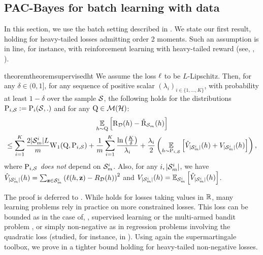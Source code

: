 \subsection{PAC-Bayes for batch learning with \iid data}
\label{sec:wasserstein-batch}

In this section, we use the batch setting described in .
We state our first result, holding for heavy-tailed losses admitting order 2 moments.
Such an assumption is in line, for instance, with reinforcement learning with heavy-tailed reward (see, \eg, \citealp{liu2011multi,lu2019optimal,zhuang2021regret}).

\begin{restatable}{theorem}{theoremsupervisedht}\label{theorem:supervised-ht}
We assume the loss $\loss$ to be $L$-Lipschitz.
Then, for any $\delta\in(0,1]$, for any sequence of positive scalar $(\lambda_i)_{i\in \{1,\dots,K\}}$, with probability at least $1-\delta$ over the sample $\S$, the following holds for the distributions $\P_{i,\S}\defeq \P_i(\S,.)$ and for any $\Q\in\Mcal(\H)$: 
\begin{multline*}
        \EE_{h\sim\Q}\Big[ \Risk_{\D}(h) - \Riskhat_{\Sm}(h) \Big]  \\ \leq    \sum_{i=1}^{K} \frac{2|\Sm^{i}|L}{m}\W_{1}(\Q, \P_{i,\S}) + \frac{1}{m}\sum_{i=1}^{K}   \frac{\ln\left( \frac{K}{\delta}  \right)}{\lambda_i} + \frac{\lambda_i}{2}\left(\EE_{h\sim \P_{i,\S}}\LB\Vhat_{|\Sm^{i}|}(h) + V_{|\Sm^{i}|}(h) \RB\right), 
    \end{multline*}
where $\P_{i,\S}$ {\it does not} depend on $\Sm^{i}$. 
Also, for any $i,|\Sm^{i}|$, we have $\Vhat_{|\Sm^{i}|}(h)= \sum_{\z\in \Sm^{i}} \left(\loss(h,\z) - R_\D(h)\right)^2$ and $V_{|\Sm^{i}|}(h) = \EE_{\Sm^{i}}\LB\Vhat_{|\Sm^{i}|}(h)\RB$.
\end{restatable}

The proof is deferred to .
While  holds for losses taking values in $\R$, many learning problems rely in practice on more constrained losses.
This loss can be bounded as in the case of, \eg, supervised learning or the multi-armed bandit problem \citep{slivkins2019intro}, or simply non-negative as in regression problems involving the quadratic loss (studied, for instance, in \citealp{catoni2016pac,catoni2017dimension}).
Using again the supermartingale toolbox, we prove in  a tighter bound holding for heavy-tailed non-negative losses. 

